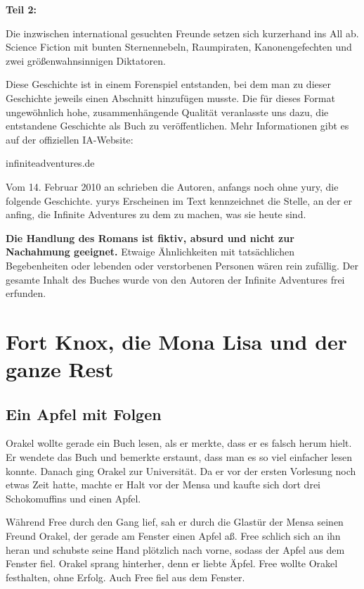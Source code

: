 \bigskip

\noindent \textbf{Teil 2:}

\noindent Die inzwischen international gesuchten Freunde setzen sich kurzerhand ins All ab. Science Fiction mit bunten Sternennebeln, Raumpiraten, Kanonengefechten und zwei größenwahnsinnigen Diktatoren.

\bigskip

\bigskip

\noindent Diese Geschichte ist in einem Forenspiel entstanden, bei dem man zu dieser Geschichte jeweils einen Abschnitt hinzufügen musste. Die für dieses Format ungewöhnlich hohe, zusammenhängende Qualität veranlasste uns dazu, die entstandene Geschichte als Buch zu veröffentlichen. Mehr Informationen gibt es auf der offiziellen IA-Website:

\noindent infiniteadventures.de

\bigskip

\noindent Vom 14. Februar 2010 an schrieben die Autoren, anfangs noch ohne yury, die folgende Geschichte. yurys Erscheinen im Text kennzeichnet die Stelle, an der er anfing, die Infinite Adventures zu dem zu machen, was sie heute sind.

\noindent \textbf{Die Handlung des Romans ist fiktiv, absurd und nicht zur Nachahmung geeignet.} Etwaige Ähnlichkeiten mit tatsächlichen Begebenheiten oder lebenden oder verstorbenen Personen wären rein zufällig. Der gesamte Inhalt des Buches wurde von den Autoren der Infinite Adventures frei erfunden.

\newpage

\part{Fort Knox, die Mona Lisa und der ganze Rest}

\chapter{Ein Apfel mit Folgen}

Orakel wollte gerade ein Buch lesen, als er merkte, dass er es falsch herum hielt. Er wendete das Buch und bemerkte erstaunt, dass man es so viel einfacher lesen konnte. Danach ging Orakel zur Universität. Da er vor der ersten Vorlesung noch etwas Zeit hatte, machte er Halt vor der Mensa und kaufte sich dort drei Schokomuffins und einen Apfel.

Während Free durch den Gang lief, sah er durch die Glastür der Mensa seinen Freund Orakel, der gerade am Fenster einen Apfel aß. Free schlich sich an ihn heran und schubste seine Hand plötzlich nach vorne, sodass der Apfel aus dem Fenster fiel. Orakel sprang hinterher, denn er liebte Äpfel. Free wollte Orakel festhalten, ohne Erfolg. Auch Free fiel aus dem Fenster.

